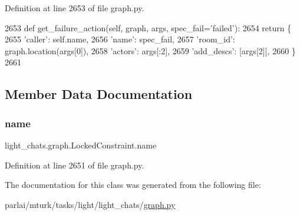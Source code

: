 Definition at line 2653 of file graph.\+py.


\begin{DoxyCode}
2653     \textcolor{keyword}{def }get\_failure\_action(self, graph, args, spec\_fail='failed'):
2654         \textcolor{keywordflow}{return} \{
2655             \textcolor{stringliteral}{'caller'}: self.name,
2656             \textcolor{stringliteral}{'name'}: spec\_fail,
2657             \textcolor{stringliteral}{'room\_id'}: graph.location(args[0]),
2658             \textcolor{stringliteral}{'actors'}: args[:2],
2659             \textcolor{stringliteral}{'add\_descs'}: [args[2]],
2660         \}
2661 
\end{DoxyCode}


\subsection{Member Data Documentation}
\mbox{\label{classlight__chats_1_1graph_1_1LockedConstraint_a3eb1d8b9659eb4aceae729d6a7e2d9f4}} 
\subsubsection{\texorpdfstring{name}{name}}
{\footnotesize\ttfamily light\+\_\+chats.\+graph.\+Locked\+Constraint.\+name\hspace{0.3cm}{\ttfamily [static]}}



Definition at line 2651 of file graph.\+py.



The documentation for this class was generated from the following file\+:\begin{DoxyCompactItemize}
\item 
parlai/mturk/tasks/light/light\+\_\+chats/\hyperlink{parlai_2mturk_2tasks_2light_2light__chats_2graph_8py}{graph.\+py}\end{DoxyCompactItemize}
